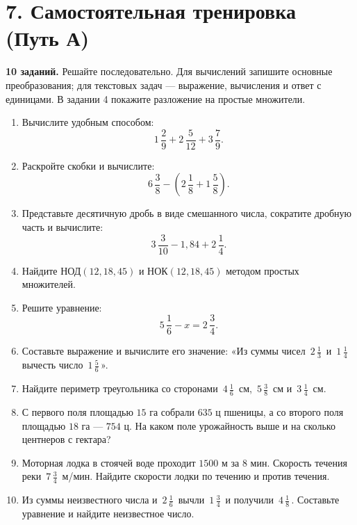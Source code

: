 \documentclass[a4paper,12pt]{article}
\newcommand{\sectionline}[1]{\section*{\color{darkaccent}#1}}
\newcommand{\mix}[3]{#1\,\frac{#2}{#3}}
\begin{document}
\clearpage
\sectionline{7. Самостоятельная тренировка (Путь А)}
\textbf{10 заданий.} Решайте последовательно. Для вычислений запишите основные
преобразования; для текстовых задач --- выражение, вычисления и ответ с единицами.
В задании 4 покажите разложение на простые множители.

\begin{enumerate}[itemsep=1.08em]
\item Вычислите удобным способом:
\[
\mix{1}{2}{9}+\mix{2}{5}{12}+\mix{3}{7}{9}.
\]
\item Раскройте скобки и вычислите:
\[
\mix{6}{3}{8}-\left(\mix{2}{1}{8}+\mix{1}{5}{8}\right).
\]
\item Представьте десятичную дробь в виде смешанного числа,
сократите дробную часть и вычислите:
\[
\mix{3}{3}{10}-1{,}84+\mix{2}{1}{4}.
\]
\item Найдите $\text{НОД}(12,18,45)$ и
$\text{НОК}(12,18,45)$ методом простых множителей.
\item Решите уравнение:
\[
\mix{5}{1}{6}-x=\mix{2}{3}{4}.
\]
\item Составьте выражение и вычислите его значение:
«Из суммы чисел $\,\mix{2}{1}{3}\,$ и $\,\mix{1}{1}{4}\,$
вычесть число $\,\mix{1}{5}{6}\,$».
\item Найдите периметр треугольника со сторонами
$\,\mix{4}{1}{6}\,$ см, $\,\mix{5}{3}{8}\,$ см и $\,\mix{3}{1}{4}\,$ см.
\item С первого поля площадью $15$ га собрали $635$ ц пшеницы,
а со второго поля площадью $18$ га --- $754$ ц.
На каком поле урожайность выше и на сколько центнеров с гектара?
\item Моторная лодка в стоячей воде проходит $1500$ м за $8$ мин.
Скорость течения реки $\,\mix{7}{3}{4}\,$ м/мин.
Найдите скорости лодки по течению и против течения.
\item Из суммы неизвестного числа и $\,\mix{2}{1}{6}\,$
вычли $\,\mix{1}{3}{4}\,$ и получили $\,\mix{4}{1}{8}\,$.
Составьте уравнение и найдите неизвестное число.
\end{enumerate}
\end{document}
